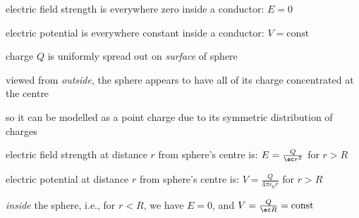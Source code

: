 \begin{ilight}
	\centering
	
	electric field strength is everywhere zero inside a conductor: $E=0$
	
	electric potential is everywhere constant inside a conductor: $V=\text{const}$
\end{ilight}

\label{ex-metal-sphere}


\sol charge $Q$ is uniformly spread out on \emph{surface} of sphere

viewed from \emph{outside}, the sphere appears to have all of its charge concentrated at the centre

so it can be modelled as a point charge due to its symmetric distribution of charges

electric field strength at distance $r$ from sphere's centre is: $E = \frac{Q}{\ec r^2}$ for $r>R$

electric potential at distance $r$ from sphere's centre is: $V=\frac{Q}{4\pi\epsilon_0r}$ for $r>R$

\emph{inside} the sphere, i.e., for $r<R$, we have $E=0$, and $V=\frac{Q}{\ec R} = \text{const}$ \eoe

